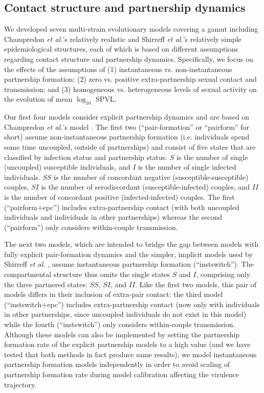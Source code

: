 \documentclass[10pt,letterpaper]{article}
\newcommand{\Lspvl}{$\log_{10}$ SPVL}
\newcommand{\etal}{\textit{et al.}}
\begin{document}
\subsection*{Contact structure and partnership dynamics}

We developed seven multi-strain evolutionary models covering a gamut including Champredon \etal's relatively realistic \cite{champredon_hiv_2013} and Shirreff \etal's relatively simple \cite{shirreff_transmission_2011} epidemiological structures, each of which is based on different assumptions regarding contact structure and partnership dynamics. Specifically, we focus on the effects of the assumptions of (1) instantaneous vs. non-instantaneous partnership formation; (2) zero vs. positive extra-partnership sexual contact and transmission; and (3) homogeneous vs. heterogeneous levels of sexual activity on the evolution of mean \Lspvl.

Our first four models consider explicit partnership dynamics and are based on Champredon \etal's model \cite{champredon_hiv_2013}. The first two (``pair-formation'' or ``pairform'' for short) assume non-instantaneous partnership formation (i.e. individuals spend some time uncoupled, outside of partnerships) and consist of five states that are classified by infection status and partnership status. $S$ is the number of single (uncoupled) susceptible individuals, and $I$ is the number of single infected individuals. $SS$ is the number of concordant negative (susceptible-susceptible) couples, $SI$ is the number of serodiscordant (susceptible-infected) couples, and $II$ is the number of concordant positive (infected-infected) couples. The first (``pairform+epc'') includes extra-partnership contact (with both uncoupled individuals and individuals in other partnerships) whereas the second (``pairform'') only considers within-couple transmission. 

The next two models, which are intended to bridge the gap between models with fully explicit pair-formation dynamics and the simpler, implicit models used by Shirreff \emph{et al.} \cite{shirreff_transmission_2011}, assume instantaneous partnership formation (``instswitch''). The compartmental structure thus omits the single states $S$ and $I$, comprising only the three partnered states: $SS$, $SI$, and $II$. Like the first two models, this pair of models differs in their inclusion of extra-pair contact: the third model (``instswitch+epc'') includes extra-partnership contact (now only with individuals in other partnerships, since uncoupled individuals do not exist in this model) while the fourth (``instswitch'') only considers within-couple transmission. Although these models can also be implemented
by setting the partnership formation rate of the explicit partnership models to a high value (and we have tested that both methods in fact produce same results), we model instantaneous partnership formation models independently in order to avoid scaling of partnership formation rate during model calibration affecting the virulence trajectory.
\end{document}

